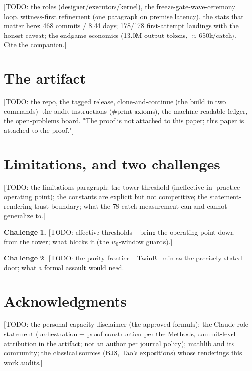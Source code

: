 \documentclass[11pt]{amsart}
\theoremstyle{remark}
\begin{document}
[TODO: the roles (designer/executors/kernel), the freeze-gate-wave-ceremony
loop, witness-first refinement (one paragraph on premise latency), the
stats that matter here: 468 commits / 8.44 days; 178/178 first-attempt
landings with the honest caveat; the endgame economics (13.0M output
tokens, $\approx$650k/catch). Cite the companion.]

\section{The artifact}\label{sec:artifact}

[TODO: the repo, the tagged release, clone-and-continue (the build in two
commands), the audit instructions (\#print axioms), the machine-readable
ledger, the open-problems board. "The proof is not attached to this paper;
this paper is attached to the proof."]

\section{Limitations, and two challenges}\label{sec:challenges}

[TODO: the limitations paragraph: the tower threshold (ineffective-in-
practice operating point); the constants are explicit but not competitive;
the statement-rendering trust boundary; what the 78-catch measurement can
and cannot generalize to.]

\textbf{Challenge 1.} [TODO: effective thresholds -- bring the operating
point down from the tower; what blocks it (the $w_0$-window guards).]

\textbf{Challenge 2.} [TODO: the parity frontier -- TwinB\_min as the
precisely-stated door; what a formal assault would need.]

\section*{Acknowledgments}
[TODO: the personal-capacity disclaimer (the approved formula); the Claude
role statement (orchestration + proof construction per the Methods;
commit-level attribution in the artifact; not an author per journal
policy); mathlib and its community; the classical sources (BJS, Tao's
expositions) whose renderings this work audits.]
\end{document}

